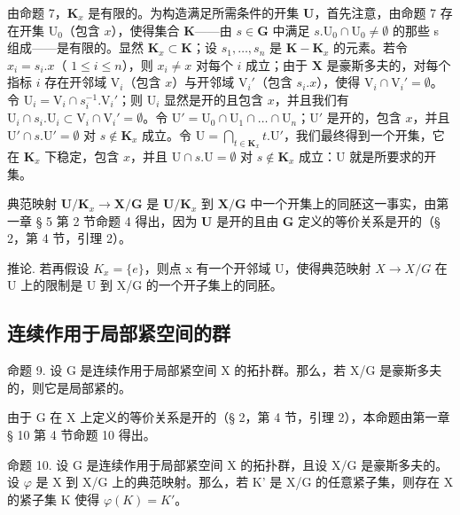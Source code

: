 由命题 7，\(\mathbf{K}_x\) 是有限的。为构造满足所需条件的开集 \(\mathbf{U}\)，首先注意，由命题 7 存在开集 \(\mathrm{U}_0\)（包含 \(x\)），使得集合 \(\mathbf{K}\)——由 \(s \in \mathbf{G}\) 中满足 \(s. \mathrm{U}_0 \cap \mathrm{U}_0 \neq \emptyset\) 的那些 s 组成——是有限的。显然 \(\mathbf{K}_x \subset \mathbf{K}\)；设 \(s_1, \ldots, s_n\) 是 \(\mathbf{K} - \mathbf{K}_x\) 的元素。若令 \(x_i = s_i.x\)（ \(1 \leqslant i \leqslant n\)），则 \(x_i \neq x\) 对每个 \(i\) 成立；由于 \(\mathbf{X}\) 是豪斯多夫的，对每个指标 \(i\) 存在开邻域 \(\mathrm{V}_i\)（包含 \(x\)）与开邻域 \(\mathrm{V}_i'\)（包含 \(s_i.x\)），使得 \(\mathrm{V}_i \cap \mathrm{V}_i' = \emptyset\)。令 \(\mathrm{U}_i = \mathrm{V}_i \cap s_i^{-1}. \mathrm{V}_i'\)；则 \(\mathrm{U}_i\) 显然是开的且包含 \(x\)，并且我们有 \(\mathrm{U}_i \cap s_i. \mathrm{U}_i \subset \mathrm{V}_i \cap \mathrm{V}_i' = \emptyset\)。令 \(\mathrm{U}' = \mathrm{U}_0 \cap \mathrm{U}_1 \cap \ldots \cap \mathrm{U}_n\)；\(\mathrm{U}'\) 是开的，包含 \(x\)，并且 \(\mathrm{U}' \cap s. \mathrm{U}' = \emptyset\) 对 \(s \notin \mathbf{K}_x\) 成立。令 \(\mathrm{U} = \bigcap_{t \in \mathbf{K}_x} t. \mathrm{U}'\)，我们最终得到一个开集，它在 \(\mathbf{K}_x\) 下稳定，包含 \(x\)，并且 \(\mathrm{U} \cap s. \mathrm{U} = \emptyset\) 对 \(s \notin \mathbf{K}_x\) 成立：\(\mathrm{U}\) 就是所要求的开集。

典范映射 \(\mathbf{U} / \mathbf{K}_x\to \mathbf{X} / \mathbf{G}\) 是 \(\mathbf{U} / \mathbf{K}_x\) 到 \(\mathbf{X} / \mathbf{G}\) 中一个开集上的同胚这一事实，由第一章 § 5 第 2 节命题 4 得出，因为 \(\mathbf{U}\) 是开的且由 \(\mathbf{G}\) 定义的等价关系是开的（§ 2，第 4 节，引理 2）。

推论. 若再假设 \(K_{x}=\{e\}\)，则点 x 有一个开邻域 U，使得典范映射 \(X\to X/G\) 在 U 上的限制是 U 到 X/G 的一个开子集上的同胚。

\subsection{连续作用于局部紧空间的群}

命题 9. 设 G 是连续作用于局部紧空间 X 的拓扑群。那么，若 X/G 是豪斯多夫的，则它是局部紧的。

由于 G 在 X 上定义的等价关系是开的（§ 2，第 4 节，引理 2），本命题由第一章 § 10 第 4 节命题 10 得出。

命题 10. 设 G 是连续作用于局部紧空间 X 的拓扑群，且设 X/G 是豪斯多夫的。设 \(\varphi\) 是 X 到 X/G 上的典范映射。那么，若 K' 是 X/G 的任意紧子集，则存在 X 的紧子集 K 使得 \(\varphi(K) = K'\)。

